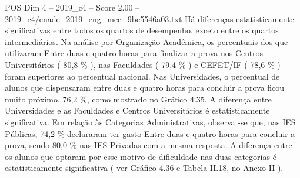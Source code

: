 \begin{textsample}{POS Dim 4 – 2019\_c4 – Score 2.00 – 2019\_c4/enade\_2019\_eng\_mec\_9be5546a03.txt}
Há diferenças estatisticamente significativas entre todos os quartos de desempenho, exceto entre os quartos intermediários.
Na análise por Organização Acadêmica, os percentuais dos que utilizaram Entre duas e quatro horas para finalizar a prova nos Centros Universitários ( 80,8 \% ), nas Faculdades ( 79,4 \% ) e CEFET/IF ( 78,6 \% ) foram superiores ao percentual nacional.
Nas Universidades, o percentual de alunos que dispensaram entre duas e quatro horas para concluir a prova ficou muito próximo, 76,2 \%, como mostrado no Gráfico 4.35.
A diferença entre Universidades e as Faculdades e Centros Universitários é estatisticamente significativa.
Em relação às Categorias Administrativas, observa -se que, nas IES Públicas, 74,2 \% declararam ter gasto Entre duas e quatro horas para concluir a prova, sendo 80,0 \% nas IES Privadas com a mesma resposta.
A diferença entre os alunos que optaram por esse motivo de dificuldade nas duas categorias é estatisticamente significativa ( ver Gráfico 4.36 e Tabela II.18, no Anexo II ).

\end{textsample}
